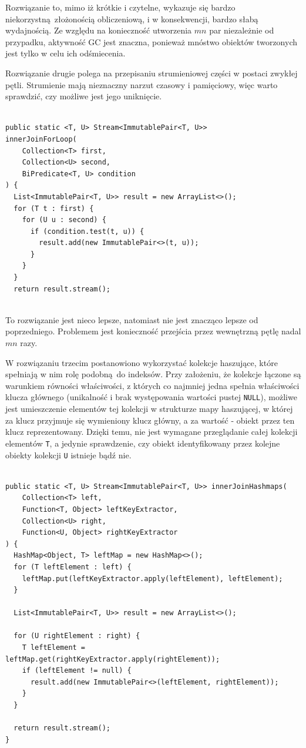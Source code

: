 \documentclass[12pt]{extarticle}
\begin{document}
    Rozwiązanie to, mimo iż krótkie i czytelne, wykazuje się bardzo niekorzystną złożonością obliczeniową, i w konsekwencji, bardzo słabą wydajnością. Ze względu na konieczność utworzenia $ mn $ par niezależnie od przypadku, aktywność GC jest znaczna, ponieważ mnóstwo obiektów tworzonych jest tylko w celu ich odśmiecenia.

    Rozwiązanie drugie polega na przepisaniu strumieniowej części w postaci zwykłej pętli. Strumienie mają nieznaczny narzut czasowy i pamięciowy, więc warto sprawdzić, czy możliwe jest jego uniknięcie.

\begin{lstlisting}[label=join2, caption=Rozwiązanie nr 2]

public static <T, U> Stream<ImmutablePair<T, U>>
innerJoinForLoop(
    Collection<T> first,
    Collection<U> second,
    BiPredicate<T, U> condition
) {
  List<ImmutablePair<T, U>> result = new ArrayList<>();
  for (T t : first) {
    for (U u : second) {
      if (condition.test(t, u)) {
        result.add(new ImmutablePair<>(t, u));
      }
    }
  }
  return result.stream();
    

\end{lstlisting}

    To rozwiązanie jest nieco lepsze, natomiast nie jest znacząco lepsze od poprzedniego. Problemem jest konieczność przejścia przez wewnętrzną pętlę nadal $ mn $ razy.

    W rozwiązaniu trzecim postanowiono wykorzystać kolekcje haszujące, które spełniają w nim rolę podobną do indeksów. Przy założeniu, że kolekcje łączone są warunkiem równości właściwości, z których co najmniej jedna spełnia właściwości klucza głównego (unikalność i brak występowania wartości pustej \texttt{NULL}), możliwe jest umieszczenie elementów tej kolekcji w strukturze mapy haszującej, w której za klucz przyjmuje się wymieniony klucz główny, a za wartość - obiekt przez ten klucz reprezentowany. Dzięki temu, nie jest wymagane przeglądanie całej kolekcji elementów \texttt{T}, a jedynie sprawdzenie, czy obiekt identyfikowany przez kolejne obiekty kolekcji \texttt{U} istnieje bądź nie.

\begin{lstlisting}[label=join3, caption=Rozwiązanie nr 3]

public static <T, U> Stream<ImmutablePair<T, U>> innerJoinHashmaps(
    Collection<T> left,
    Function<T, Object> leftKeyExtractor,
    Collection<U> right,
    Function<U, Object> rightKeyExtractor
) {
  HashMap<Object, T> leftMap = new HashMap<>();
  for (T leftElement : left) {
    leftMap.put(leftKeyExtractor.apply(leftElement), leftElement);
  }
  
  List<ImmutablePair<T, U>> result = new ArrayList<>();
  
  for (U rightElement : right) {
    T leftElement = leftMap.get(rightKeyExtractor.apply(rightElement));
    if (leftElement != null) {
      result.add(new ImmutablePair<>(leftElement, rightElement));
    }
  }
  
  return result.stream();
}
\end{lstlisting}
\end{document}
